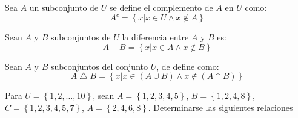 \begin{definition}
	Sea $A$ un subconjunto de $U$ se define el complemento de $A$ en $U$ como:
	\begin{equation}
		A^{c}= \left\{ x\vert x\in  U \wedge x \notin  A \right\}
	\end{equation}
\end{definition}


\begin{definition}[Diferencia]
	Sean $A$ y $B$ subconjuntos de $U$ la diferencia entre $A$ y $B$ es:
	\begin{equation}
		A-B= \left\{ x\vert x\in  A \wedge x \notin  B \right\}
	\end{equation}
\end{definition}

\begin{center}
\end{center}

\begin{definition}
	Sean $A$ y $B$ subconjuntos del conjunto $U$, de define como:
	\begin{equation}
		A\bigtriangleup B = \left\{ x\vert x\in  (A\cup B) \wedge x \notin  (A \cap B) \right\}
	\end{equation}
\end{definition}

\begin{center}
\end{center}

\begin{example}
	Para $U=\left\{ 1,2,\ldots,10  \right\}$, sean $A=\left\{ 1,2,3,4,5 \right\}$, $B=\left\{ 1,2,4,8 \right\}$, $C=\left\{ 1,2,3,4,5,7 \right\}$, $A=\left\{2,4,6,8 \right\}$. Determinarse las siguientes relaciones
\end{example}

